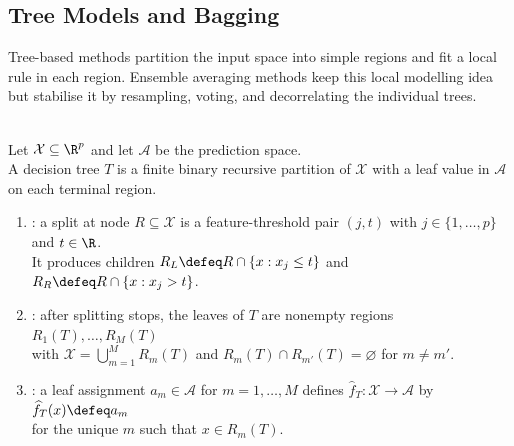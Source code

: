 \subsection{Tree Models and Bagging}
Tree-based methods partition the input space into simple regions and fit a local rule in each region.  Ensemble averaging methods keep this local modelling idea but stabilise it by resampling, voting, and decorrelating the individual trees.

\begin{definition} \label{def:sl-decision-tree} \\
Let $\mathcal{X}\subseteq\R^p$ and let $\mathcal{A}$ be the prediction space.\\
A decision tree $T$ is a finite binary recursive partition of $\mathcal{X}$ with a leaf value in $\mathcal{A}$ on each terminal region.
\begin{enumerate}[label=(\roman*)]
\setlength{\itemsep}{0pt}
\item {}: a split at node $R\subseteq\mathcal{X}$ is a feature-threshold pair $(j,t)$ with $j\in\{1,\ldots,p\}$ and $t\in\R$.\\
It produces children $R_L\defeq R\cap\{x:x_j\leq t\}$ and $R_R\defeq R\cap\{x:x_j>t\}$.
\item {}: after splitting stops, the leaves of $T$ are nonempty regions $R_1(T),\ldots,R_M(T)$\\
with $\mathcal{X}=\bigcup\limits_{m=1}^M R_m(T)$ and $R_m(T)\cap R_{m'}(T)=\varnothing$ for $m\neq m'$.
\item {}: a leaf assignment $a_m\in\mathcal{A}$ for $m=1,\ldots,M$ defines $\widehat{f}_T:\mathcal{X}\to\mathcal{A}$ by $\widehat{f}_T(x)\defeq a_m$\\
for the unique $m$ such that $x\in R_m(T)$.
\end{enumerate}
\end{definition}
